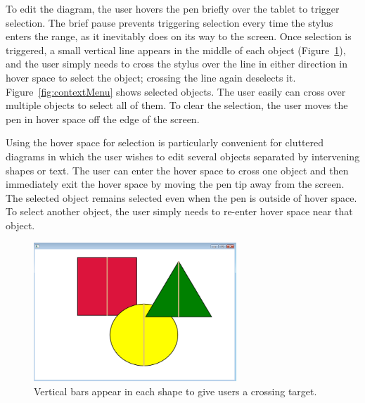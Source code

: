 \documentclass{article}
\begin{document}
To edit the diagram, the user hovers the pen briefly over the tablet
to trigger selection. The brief pause prevents triggering selection
every time the stylus enters the range, as it inevitably does on its
way to the screen. Once selection is triggered, a small vertical line
appears in the middle of each object (Figure~\ref{fig:handles}), and
the user simply needs to cross the stylus over the line in either
direction in hover space to select the object; crossing the line again
deselects it.  Figure~\ref{fig:contextMenu} shows selected
objects. The user easily can cross over multiple objects to select all
of them.  To clear the selection, the user moves the pen in hover
space off the edge of the screen.

Using the hover space for selection is particularly convenient for
cluttered diagrams in which the user wishes to edit several objects
separated by intervening shapes or text.  The user can enter the hover
space to cross one object and then immediately exit the hover space by
moving the pen tip away from the screen.  The selected object remains
selected even when the pen is outside of hover space.  To select
another object, the user simply needs to re-enter hover space near
that object.

\begin{figure}[tb]
\includegraphics[width=3.0in]{SelectionHandlesOn}
\caption{Vertical bars appear in each shape to give users a crossing
  target.} 
\label{fig:handles}
\end{figure}

\end{document}
